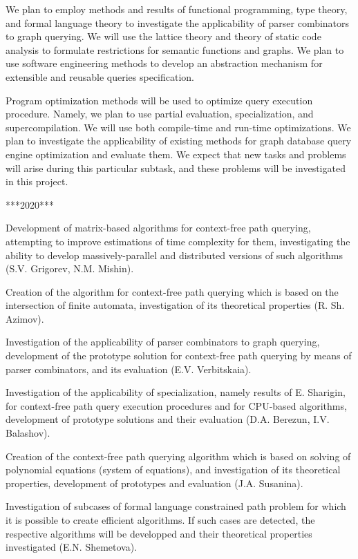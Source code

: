 \documentclass[12pt]{article}  %
\theoremstyle{remark}
\begin{document}
We plan to employ methods and results of functional programming, type theory, and formal language theory to investigate the applicability of parser combinators to graph querying. We will use the lattice theory and theory of static code analysis to formulate restrictions for semantic functions and graphs. We plan to use software engineering methods to develop an abstraction mechanism for extensible and reusable queries specification.

Program optimization methods will be used to optimize query execution procedure. Namely, we plan to use partial evaluation, specialization, and supercompilation. We will use both compile-time and run-time optimizations. We plan to investigate the applicability of existing methods for graph database query engine optimization and evaluate them. We expect that new tasks and problems will arise during this particular subtask, and these problems will be investigated in this project.

***2020***

Development of matrix-based algorithms for context-free path querying, attempting to improve estimations of time complexity for them, investigating the ability to develop massively-parallel and distributed versions of such algorithms (S.V. Grigorev, N.M. Mishin).

Creation of the algorithm for context-free path querying which is based on the intersection of finite automata, investigation of its theoretical properties (R. Sh. Azimov).

Investigation of the applicability of parser combinators to graph querying, development of the prototype solution for context-free path querying by means of parser combinators, and its evaluation (E.V. Verbitskaia).

Investigation of the applicability of specialization, namely results of E. Sharigin, for context-free path query execution procedures and for CPU-based algorithms, development of  prototype solutions and their evaluation (D.A. Berezun, I.V. Balashov).

Creation of the context-free path querying algorithm which is based on solving of polynomial equations (system of equations), and investigation of its theoretical properties, development of  prototypes and evaluation (J.A. Susanina).

Investigation of subcases of formal language constrained path problem for which it is possible to create efficient algorithms. If such cases are detected, the respective algorithms will be developped and their theoretical properties investigated (E.N. Shemetova).
\end{document}
